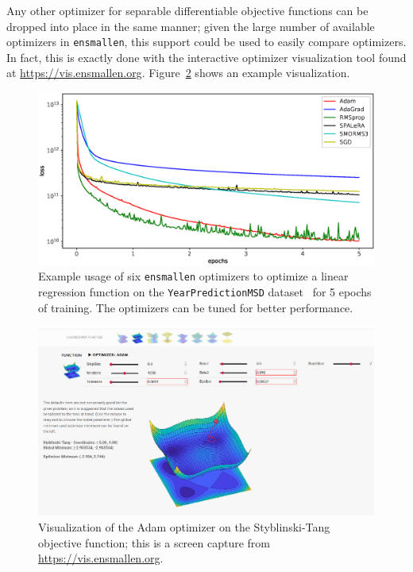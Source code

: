 Any other optimizer for separable differentiable objective
functions can be dropped into place in the same manner;
given the large number of available optimizers in {\tt ensmallen},
this support could be used to easily compare optimizers.
In fact, this is exactly done with the interactive
optimizer visualization tool found at \url{https://vis.ensmallen.org}.
Figure~\ref{fig:visualization} shows an example visualization.

\begin{figure}[t!]
  \vspace*{-1em}
  \centering
  \includegraphics[width=\textwidth,height=0.5\textwidth]{experiments/learning_curves_crop.eps}
  \vspace*{-2.5em}
\caption{
Example usage of six {\tt ensmallen} optimizers to optimize a linear regression
function on the {\tt YearPredictionMSD} dataset~\cite{ucimlrepository} for 5
epochs of training.  The optimizers can be tuned for better performance.}
\label{fig:learning_curve}
\end{figure}

\begin{figure}[t!]
  \centering
  \includegraphics[width=\textwidth]{experiments/visualization.eps}
  \vspace*{-2em}
  \caption{Visualization of the Adam optimizer on the Styblinski-Tang objective
function; this is a screen capture from \url{https://vis.ensmallen.org}.}
  \label{fig:visualization}
\end{figure}

